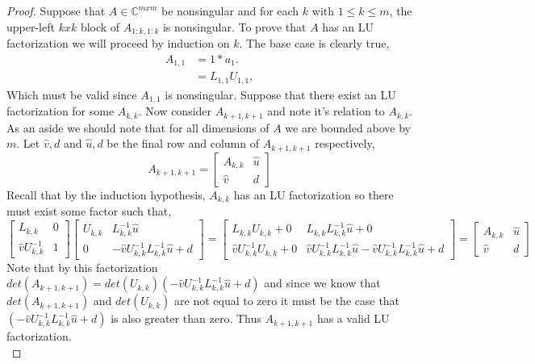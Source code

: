 \documentclass[12pt]{article}
\makeatletter
\theoremstyle{homework}
\newenvironment{exercise}[1]
{\def\@currentlabel{#1}\exercisecore}
{\endexercisecore}
\newcommand{\Cplx}{\ensuremath{\mathbb C}}
\let\CC\Cplx
\makeatother
\begin{document}
\begin{exercise}{20.1}
\begin{proof}
    \vspace{1in}
    Suppose that $A \in \CC^{mxm}$ be nonsingular and for each $k$ with 
    $1 \leq k \leq m$, the upper-left $kxk$ block of $A_{1:k, 1:k}$ is nonsingular. To prove that $A$ has an LU factorization we will proceed by induction on $k$.
    The base case is clearly true, 
    \begin{align*}
      A_{1, 1} &= 1*a_1.\\
       &=  L_{1, 1}U_{1, 1},
    \end{align*}
    Which must be valid since $A_{1, 1}$ is nonsingular. Suppose that there exist an LU factorization for some $A_{k, k}$. Now consider $A_{k+1, k+1}$ and note it's relation to $A_{k, k}$.
     As an aside we should note that for all dimensions of $A$ we are bounded above by $m$. Let $\hat{v}, d$ and $\hat{u}, d$ be the final row and column of $A_{k+1, k+1}$ respectively, 
    \begin{equation*}
      A_{k+1, k+1} = 
      \begin{bmatrix}
        A_{k, k} & \hat{u}\\
        \hat{v} & d
      \end{bmatrix}
    \end{equation*}
    Recall that by the induction hypothesis, $A_{k, k}$ has an LU factorization so there must exist some factor such that, 
    \begin{equation*} 
      \begin{bmatrix}
        L_{k, k} & 0\\
        \hat{v}U^{-1}_{k, k} & 1
      \end{bmatrix}
      \begin{bmatrix}
        U_{k, k} & L^{-1}_{k, k}\hat{u}\\
        0 & -\hat{v}U^{-1}_{k, k}L^{-1}_{k, k}\hat{u} + d
      \end{bmatrix} = 
      \begin{bmatrix}
        L_{k, k}U_{k, k} + 0 & L_{k, k}L^{-1}_{k, k}\hat{u} + 0\\
        \hat{v}U^{-1}_{k, k}U_{k, k} + 0 & \hat{v}U^{-1}_{k, k}L^{-1}_{k, k}\hat{u}-\hat{v}U^{-1}_{k, k}L^{-1}_{k, k}\hat{u} + d
      \end{bmatrix} = 
      \begin{bmatrix}
        A_{k, k} & \hat{u}\\
        \hat{v} & d
      \end{bmatrix} 
    \end{equation*}
    Note that by this factorization $det(A_{k+1, k+1}) = det(U_{k, k})(-\hat{v}U^{-1}_{k, k}L^{-1}_{k, k}\hat{u} + d)$ and since we know that $det(A_{k+1, k+1})$ and $det(U_{k, k})$ are not equal to zero 
    it must be the case that $(-\hat{v}U^{-1}_{k, k}L^{-1}_{k, k}\hat{u} + d)$ is also greater than zero. Thus $A_{k+1, k+1}$ has a valid LU factorization.\\
    

\end{proof}
\end{exercise}
\end{document}

